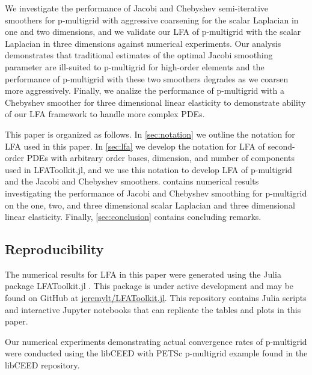 \documentclass[review]{siamart190516}
\begin{document}
We investigate the performance of Jacobi and Chebyshev semi-iterative smoothers for p-multigrid with aggressive coarsening for the scalar Laplacian in one and two dimensions, and we validate our LFA of p-multigrid with the scalar Laplacian in three dimensions against numerical experiments.
Our analysis demonstrates that traditional estimates of the optimal Jacobi smoothing parameter are ill-suited to p-multigrid for high-order elements and the performance of p-multigrid with these two smoothers degrades as we coarsen more aggressively.
Finally, we analize the performance of p-multigrid with a Chebyshev smoother for three dimensional linear elasticity to demonstrate ability of our LFA framework to handle more complex PDEs.

This paper is organized as follows.
In \cref{sec:notation} we outline the notation for LFA used in this paper.
In \cref{sec:lfa} we develop the notation for LFA of second-order PDEs with arbitrary order bases, dimension, and number of components used in LFAToolkit.jl, and we use this notation to develop LFA of p-multigrid and the Jacobi and Chebyshev smoothers.
 contains numerical results investigating the performance of Jacobi and Chebyshev smoothing for p-multigrid on the one, two, and three dimensional scalar Laplacian and three dimensional linear elasticity.
Finally, \cref{sec:conclusion} contains concluding remarks.

\subsection{Reproducibility}\label{sec:reproducibility}

The numerical results for LFA in this paper were generated using the Julia package LFAToolkit.jl \cite{thompson2021toolkit}.
This package is under active development and may be found on GitHub at \href{https://github.com/jeremylt/LFAToolkit.jl}{jeremylt/LFAToolkit.jl}.
This repository contains Julia scripts and interactive Jupyter notebooks that can replicate the tables and plots in this paper.

Our numerical experiments demonstrating actual convergence rates of p-multigrid were conducted using the libCEED \cite{libceed-user-manual} with PETSc \cite{petsc-user-ref} p-multigrid example found in the libCEED repository.

\end{document}

